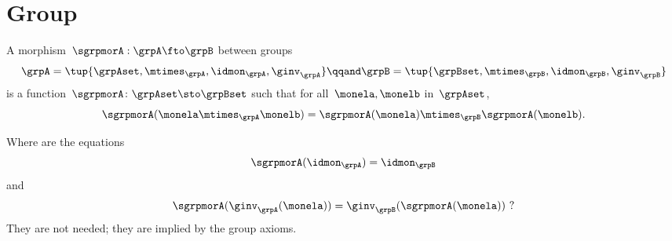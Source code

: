 \section{Group \whomos}


\begin{ctdefinition}
    \label{def:group-mor}
    A morphism~$\sgrpmorA: \grpA \fto \grpB$ between groups
    \begin{equation}
        \grpA = \tup{\grpAset, \mtimes_\grpA, \idmon_\grpA, \ginv_\grpA}
        \qqand
        \grpB = \tup{\grpBset, \mtimes_\grpB, \idmon_\grpB,  \ginv_\grpB}
    \end{equation}
    is a function~$\sgrpmorA \colon \grpAset \sto \grpBset$ such that for all~$\monela, \monelb$ in~$\grpAset$,
    \begin{equation}
        \label{eq:group-mor-comp}
        \sgrpmorA (\monela \mtimes_{\grpA} \monelb) = \sgrpmorA (\monela) \mtimes_{\grpB}  \sgrpmorA(\monelb).
    \end{equation}
\end{ctdefinition}

Where are the equations
\begin{equation}
    \label{eq:grp-id-comp}
    \sgrpmorA (\idmon_\grpA) = \idmon_{\grpB}
\end{equation}
and
\begin{equation}
    \label{eq:grp-inv-comp}
    \sgrpmorA (\ginv_\grpA(\monela)) = \ginv_\grpB(\sgrpmorA(\monela)) \ ?
\end{equation}
%
They are not needed; they are implied by the group axioms.

